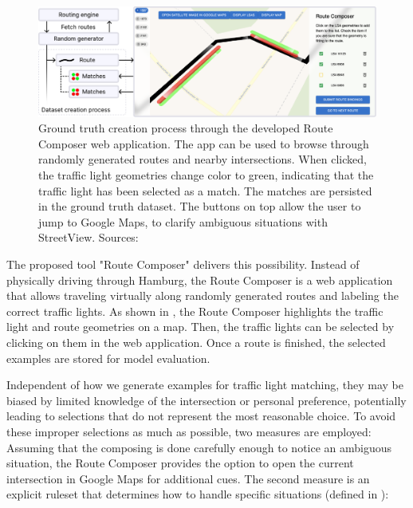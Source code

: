 \begin{figure}[!b]
\centering
\includegraphics[width=\linewidth]{images/sg-selection-ground-truth.pdf}
\caption{Ground truth creation process through the developed Route Composer web application. The app can be used to browse through randomly generated routes and nearby intersections. When clicked, the traffic light geometries change color to green, indicating that the traffic light has been selected as a match. The matches are persisted in the ground truth dataset. The buttons on top allow the user to jump to Google Maps, to clarify ambiguous situations with StreetView. Sources: \cite{matthes2022matching, matthes2023geo}}
\label{fig:sg-selection-ground-truth}
\end{figure}

The proposed tool "Route Composer" delivers this possibility. Instead of physically driving through Hamburg, the Route Composer is a web application that allows traveling virtually along randomly generated routes and labeling the correct traffic lights. As shown in , the Route Composer highlights the traffic light and route geometries on a map. Then, the traffic lights can be selected by clicking on them in the web application. Once a route is finished, the selected examples are stored for model evaluation.

Independent of how we generate examples for traffic light matching, they may be biased by limited knowledge of the intersection or personal preference, potentially leading to selections that do not represent the most reasonable choice. To avoid these improper selections as much as possible, two measures are employed: Assuming that the composing is done carefully enough to notice an ambiguous situation, the Route Composer provides the option to open the current intersection in Google Maps for additional cues. The second measure is an explicit ruleset that determines how to handle specific situations (defined in \cite{matthes2023geo}):

